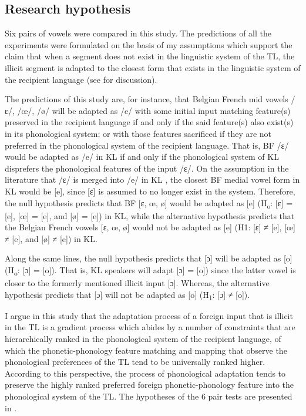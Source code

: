 \documentclass[output=paper]{langscibook}
\begin{document}
\subsection{Research hypothesis}
Six pairs of vowels were compared in this study. The predictions of all the experiments were formulated on the basis of my assumptions which support the claim that when a segment does not exist in the linguistic system of the TL, the illicit segment is adapted to the closest form that exists in the linguistic system of the recipient language (see \citealt{kang2011loanword} for discussion).

The predictions of this study are, for instance, that Belgian French mid vowels /ɛ/, /œ/, /ø/ will be adapted as /e/ with some initial input matching feature(s) preserved in the recipient language if and only if the said feature(s) also exist(s) in its phonological system; or with those features sacrificed if they are not preferred in the phonological system of the recipient language. That is, BF /ɛ/ would be adapted as /e/ in KL if and only if the phonological system of KL disprefers the phonological features of the input /ɛ/.
On the assumption in the literature that /ɛ/ is merged into /e/ in KL \citep{motingea2006,bokamba2012polylectal,campbell2013compendium} , the closest BF medial vowel form in KL would be [e], since [ɛ]
is assumed to no longer exist in the system. Therefore, the null hypothesis predicts that BF [ɛ, œ, ø] would be adapted as [e] (H\textsubscript{o}: [ɛ] = [e], [œ] = [e], and [ø] = [e]) in KL, while the alternative hypothesis predicts that the Belgian French vowels [ɛ, œ, ø] would not be adapted as [e] (H1: [ɛ] ≠ [e], [œ] ≠ [e], and [ø] ≠ [e]) in KL.

Along the same lines, the null hypothesis predicts that [ɔ] will be adapted as [o] (H\textsubscript{o}: [ɔ] = [o]). That is, KL speakers will adapt [ɔ] = [o]) since the latter vowel is closer to the formerly mentioned illicit input [ɔ]. Whereas, the alternative hypothesis predicts that [ɔ] will not be adapted as [o] (H\textsubscript{1}: [ɔ] ≠ [o]).

I argue in this study that the adaptation process of a foreign input that is illicit in the TL is a gradient process which abides by a number of constraints that are hierarchically ranked in the phonological system of the recipient language, of which the phonetic-phonology feature matching and mapping that observe the phonological preferences of the TL tend to be universally ranked higher. According to this perspective, the process of phonological adaptation tends to preserve the highly ranked preferred foreign phonetic-phonology feature into the phonological system of the TL. The hypotheses of the 6 pair tests are presented in .
\end{document}

